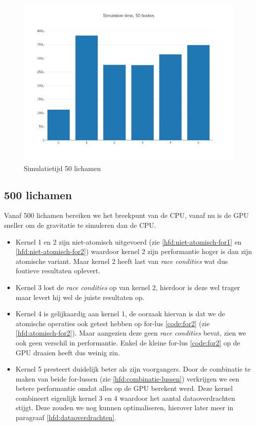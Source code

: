 \documentclass{article}
\begin{document}
\begin{figure}[H]
    \includegraphics[width=\linewidth]{./grafiekskes/hist_simulation50.png}
    \caption{Simulatietijd 50 lichamen}
\end{figure}

\subsection{500 lichamen}
\label{hfd:lichamen-500}
Vanaf 500 lichamen bereiken we het breekpunt van de CPU, vanaf nu is de GPU sneller
om de gravitatie te simuleren dan de CPU.

\begin{itemize}
    \item Kernel 1 en 2 zijn niet-atomisch uitgevoerd (zie \ref{hfd:niet-atomisch-for1} en \ref{hfd:niet-atomisch-for2}) waardoor kernel 2 zijn performantie hoger is dan zijn atomische variant.
    Maar kernel 2 heeft last van \textit{race condities} wat dus foutieve resultaten oplevert.
    \item Kernel 3 lost de \textit{race condities} op van kernel 2, hierdoor is deze wel trager maar levert hij wel de juiste resultaten op.
    \item Kernel 4 is gelijkaardig aan kernel 1, de oorzaak hiervan is dat we de atomische operaties ook getest hebben op for-lus \ref{code:for2} (zie \ref{hfd:atomisch-for2}).
    Maar aangezien deze geen \textit{race condities} bevat, zien we ook geen verschil in performantie. Enkel de kleine for-lus \ref{code:for2} op de GPU draaien heeft dus weinig zin.
    \item Kernel 5 presteert duidelijk beter als zijn voorgangers. Door de combinatie te maken van beide for-lussen (zie \ref{hfd:combinatie-lussen}) verkrijgen we een betere performantie
    omdat alles op de GPU berekent werd. Deze kernel combineert eigenlijk kernel 3 en 4 waardoor het aantal dataoverdrachten stijgt.
    Deze zouden we nog kunnen optimaliseren, hierover later meer in paragraaf \ref{hfd:dataoverdrachten}.
\end{itemize}
\end{document}
